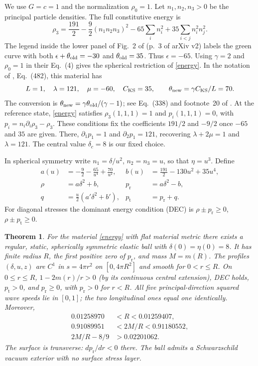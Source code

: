 \documentclass[11pt]{article}
\newtheorem{theorem}{Theorem}
\newcommand{\dd}{\delta}
\newcommand{\pr}{p_{\mathrm r}}
\newcommand{\pt}{p_{\mathrm t}}
\begin{document}
We use $G=c=1$ and the normalization $\rho_0=1$. Let $n_1,n_2,n_3>0$ be the principal particle densities. The full constitutive energy is
\begin{equation}\label{energy}
 \rho_3=\frac{191}{2}-\frac92(n_1n_2n_3)^2
       -65\sum_i n_i^2+35\sum_{i<j}n_i^2n_j^2.
\end{equation}
The legend inside the lower panel of Fig.~2 of \cite{ANPR22} (p.~3 of arXiv v2) labels the green curve with both $\epsilon+\theta_{\rm old}=-30$ and $\theta_{\rm old}=35$. Thus $\epsilon=-65$. Using $\gamma=2$ and $\rho_0=1$ in their Eq.~(4) gives the spherical restriction of \eqref{energy}. In the notation of \cite{ANPR24}, Eq.~(482), this material has
\[
 L=1,\quad \lambda=121,\quad \mu=-60,\quad C_{\rm KS}=35,
 \qquad \theta_{\rm new}=\gamma C_{\rm KS}/L=70.
\]
The conversion is $\theta_{\rm new}=\gamma\theta_{\rm old}/(\gamma-1)$; see Eq.~(338) and footnote~20 of \cite{ANPR24}. At the reference state, \eqref{energy} satisfies $\rho_3(1,1,1)=1$ and $p_i(1,1,1)=0$, with $p_i=n_i\partial_i\rho_3-\rho_3$. These conditions fix the coefficients $191/2$ and $-9/2$ once $-65$ and $35$ are given. There, $\partial_1p_1=1$ and $\partial_2p_1=121$, recovering $\lambda+2\mu=1$ and $\lambda=121$. The central value $\delta_c=8$ is our fixed choice.

In spherical symmetry write $n_1=\dd/u^2$, $n_2=n_3=u$, so that $\eta=u^3$. Define
\begin{align}
 a(u)&=-\frac92-\frac{65}{u^4}+\frac{70}{u^2},&
 b(u)&=\frac{191}{2}-130u^2+35u^4,\\
 \rho&=a\dd^2+b,&\pr&=a\dd^2-b,\label{pressures}\\
 q&=\frac u2(a'\dd^2+b'),&\pt&=\pr+q.\nonumber
\end{align}
For diagonal stresses the dominant energy condition (DEC) is $\rho\pm\pr\geq0$, $\rho\pm\pt\geq0$.

\begin{theorem}\label{main}
For the material \eqref{energy} with flat material metric there exists a regular, static, spherically symmetric elastic ball with $\dd(0)=\eta(0)=8$. It has finite radius $R$, the first positive zero of $\pr$, and mass $M=m(R)$. The profiles $(\dd,u,z)$ are $C^1$ in $s=4\pi r^2$ on $[0,4\pi R^2]$ and smooth for $0<r\leq R$. On $0\leq r\leq R$, $1-2m(r)/r>0$ (by its continuous central extension), DEC holds, $\pt>0$, and $\pr\geq0$, with $\pr>0$ for $r<R$. All five principal-direction squared wave speeds lie in $[0,1]$; the two longitudinal ones equal one identically. Moreover,
\begin{align*}
 0.01258970&<R<0.01259407,\\
 0.91089951&<2M/R<0.91180552,\\
 2M/R-8/9&>0.02201062.
\end{align*}
The surface is transverse: $d\pr/dr<0$ there. The ball admits a Schwarzschild vacuum exterior with no surface stress layer.
\end{theorem}
\end{document}
